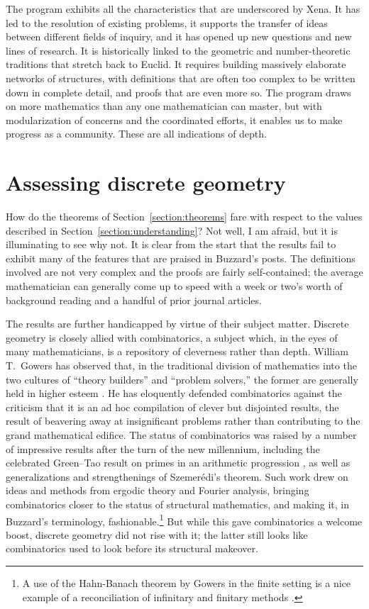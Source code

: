 \documentclass[12pt]{amsart}
\theoremstyle{definition}
\theoremstyle{remark}
\numberwithin{equation}{section}
\begin{document}
The program exhibits all the characteristics that are underscored by Xena. It has led to the resolution of existing problems, it supports the transfer of ideas between different fields of inquiry, and it has opened up new questions and new lines of research. It is historically linked to the geometric and number-theoretic traditions that stretch back to Euclid. It requires building massively elaborate networks of structures, with definitions that are often too complex to be written down in complete detail, and proofs that are even more so. The program draws on more mathematics than any one mathematician can master, but with modularization of concerns and the coordinated efforts, it enables us to make progress as a community. These are all indications of depth.

\section{Assessing discrete geometry}
\label{section:assessment}

How do the theorems of Section~\ref{section:theorems} fare with respect to the values described in Section~\ref{section:understanding}? Not well, I am afraid, but it is illuminating to see why not. It is clear from the start that the results fail to exhibit many of the features that are praised in Buzzard's posts. The definitions involved are not very complex and the proofs are fairly self-contained; the average mathematician can generally come up to speed with a week or two's worth of background reading and a handful of prior journal articles.

The results are further handicapped by virtue of their subject matter. Discrete geometry is closely allied with combinatorics, a subject which, in the eyes of many mathematicians, is a repository of cleverness rather than depth. William T.~Gowers has observed that, in the traditional division of mathematics into the two cultures of ``theory builders'' and ``problem solvers,'' the former are generally held in higher esteem \cite{gowers:00}. He has eloquently defended combinatorics against the criticism that it is an ad hoc compilation of clever but disjointed results, the result of beavering away at insignificant problems rather than contributing to the grand mathematical edifice. The status of combinatorics was raised by a number of impressive results after the turn of the new millennium, including the celebrated Green--Tao result on primes in an arithmetic progression \cite{green:tao:08}, as well as generalizations and strengthenings of Szemer\'edi's theorem. Such work drew on ideas and methods from ergodic theory and Fourier analysis, bringing combinatorics closer to the status of structural mathematics, and making it, in Buzzard's terminology, fashionable.\footnote{A use of the Hahn-Banach theorem by Gowers in the finite setting is a nice example of a reconciliation of infinitary and finitary methods \cite{gowers:10}.} But while this gave combinatorics a welcome boost, discrete geometry did not rise with it; the latter still looks like combinatorics used to look before its structural makeover.
\end{document}
